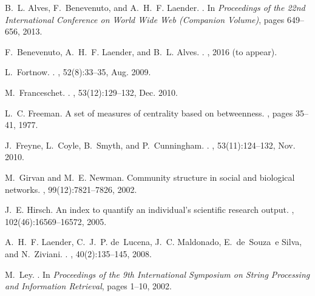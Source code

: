 \documentclass{sig-alternate-10pt}
\begin{document}
\begin{thebibliography}{10}
\vspace{0.1cm}
B.~L. Alves, F.~Benevenuto, and A.~H.~F. Laender.
.
\newblock In {\em Proceedings of the 22nd International Conference on World
  Wide Web (Companion Volume)}, pages 649--656, 2013.

F.~Benevenuto, A.~H.~F. Laender, and B.~L. Alves.
.
, 2016 (to appear).

L.~Fortnow.
.
, 52(8):33--35, Aug. 2009.

M.~Franceschet.
.
, 53(12):129--132, Dec. 2010.

L.~C. Freeman.
\newblock A set of measures of centrality based on betweenness.
, pages 35--41, 1977.

J.~Freyne, L.~Coyle, B.~Smyth, and P.~Cunningham.
.
, 53(11):124--132, Nov. 2010.

M.~Girvan and M.~E. Newman.
\newblock Community structure in social and biological networks.
, 99(12):7821--7826, 2002.

J.~E. Hirsch.
\newblock An index to quantify an individual's scientific research output.
, 102(46):16569--16572, 2005.

A.~H.~F. Laender, C.~J.~P. de~Lucena, J.~C. Maldonado, E.~de~Souza~e Silva, and
  N.~Ziviani.
.
, 40(2):135--145, 2008.

M.~Ley.
.
\newblock In {\em Proceedings of the 9th International Symposium on String
  Processing and Information Retrieval}, pages 1--10, 2002.


\end{thebibliography}
\end{document}

